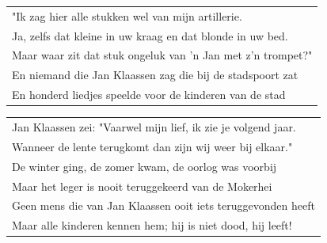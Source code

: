 \documentclass[a4paper, 14pt]{extarticle}
\begin{document}
\begin{flushleft}
\begin{tabularx}{\textwidth} {
   >{\raggedright\arraybackslash}X}
"Ik zag hier alle stukken wel van mijn artillerie.\\
Ja, zelfs dat kleine in uw kraag en dat blonde in uw bed.\\
Maar waar zit dat stuk ongeluk van ’n Jan met z’n trompet?"\\
En niemand die Jan Klaassen zag die bij de stadspoort zat\\
En honderd liedjes speelde voor de kinderen van de stad\\
\end{tabularx}
\end{flushleft}\begin{flushleft}
\begin{tabularx}{\textwidth} {
   >{\raggedright\arraybackslash}X}
Jan Klaassen zei: "Vaarwel mijn lief, ik zie je volgend jaar.\\
Wanneer de lente terugkomt dan zijn wij weer bij elkaar."\\
De winter ging, de zomer kwam, de oorlog was voorbij\\
Maar het leger is nooit teruggekeerd van de Mokerhei\\
Geen mens die van Jan Klaassen ooit iets teruggevonden heeft\\
Maar alle kinderen kennen hem; hij is niet dood, hij leeft!\\
\end{tabularx}
\end{flushleft}
\end{document}
